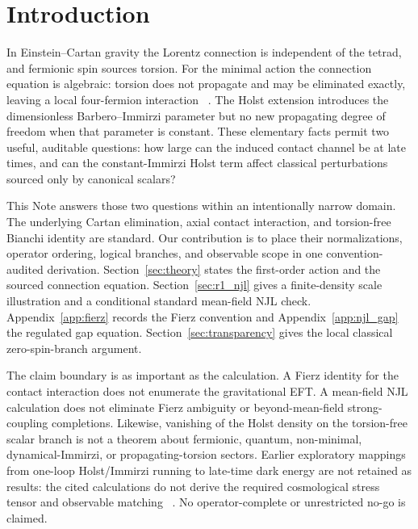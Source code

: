 \documentclass[aps,prd,twocolumn,superscriptaddress,preprintnumbers,nofootinbib,longbibliography,floatfix]{revtex4-2}
\begin{document}

\maketitle
\tableofcontents


\section{Introduction}\label{sec:intro}

In Einstein--Cartan gravity the Lorentz connection is independent of the
tetrad, and fermionic spin sources torsion.  For the minimal action the
connection equation is algebraic: torsion does not propagate and may be
eliminated exactly, leaving a local four-fermion interaction
~\cite{Hehl1976,HehlDattaNJL1971,Freidel2005}.  The Holst extension introduces
the dimensionless Barbero--Immirzi parameter but no new propagating degree of
freedom when that parameter is constant.  These elementary facts permit two
useful, auditable questions: how large can the induced contact channel be at
late times, and can the constant-Immirzi Holst term affect classical
perturbations sourced only by canonical scalars?

This Note answers those two questions within an intentionally narrow domain.
The underlying Cartan elimination, axial contact interaction, and torsion-free
Bianchi identity are standard.  Our contribution is to place their
normalizations, operator ordering, logical branches, and observable scope in
one convention-audited derivation.  Section~\ref{sec:theory} states the
first-order action and the sourced connection equation.
Section~\ref{sec:r1_njl} gives a finite-density scale illustration and a
conditional standard mean-field NJL check.  Appendix~\ref{app:fierz} records
the Fierz convention and Appendix~\ref{app:njl_gap} the regulated gap equation.
Section~\ref{sec:transparency} gives the local classical zero-spin-branch
argument.

The claim boundary is as important as the calculation.  A Fierz identity for
the contact interaction does not enumerate the gravitational EFT.  A
mean-field NJL calculation does not eliminate Fierz ambiguity or
beyond-mean-field strong-coupling completions.  Likewise, vanishing of the
Holst density on the torsion-free scalar branch is not a theorem about
fermionic, quantum, non-minimal, dynamical-Immirzi, or propagating-torsion
sectors.  Earlier exploratory mappings from one-loop Holst/Immirzi running to
late-time dark energy are not retained as results: the cited calculations do
not derive the required cosmological stress tensor and observable matching
~\cite{ShapiroTeixeira2014,BenedettiSpeziale2011run}.  No operator-complete or
unrestricted no-go is claimed.
\end{document}
